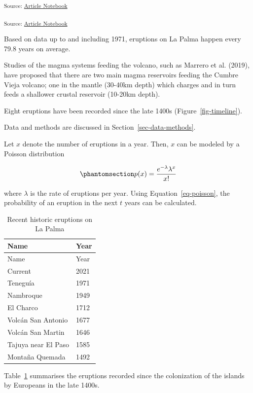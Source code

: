 \documentclass[
]{agujournal2019}
\begin{document}
\textsubscript{Source:
\href{https://tipauwel.github.io/manuscript-tutorial/index.qmd.html}{Article
Notebook}}

\textsubscript{Source:
\href{https://tipauwel.github.io/manuscript-tutorial/index.qmd.html}{Article
Notebook}}

Based on data up to and including 1971, eruptions on La Palma happen
every 79.8 years on average.

Studies of the magma systems feeding the volcano, such as Marrero et al.
(2019), have proposed that there are two main magma reservoirs feeding
the Cumbre Vieja volcano; one in the mantle (30-40km depth) which
charges and in turn feeds a shallower crustal reservoir (10-20km depth).

Eight eruptions have been recorded since the late 1400s
(Figure~\ref{fig-timeline}).

Data and methods are discussed in Section~\ref{sec-data-methods}.

Let \(x\) denote the number of eruptions in a year. Then, \(x\) can be
modeled by a Poisson distribution

\begin{equation}\phantomsection\label{eq-poisson}{
p(x) = \frac{e^{-\lambda} \lambda^{x}}{x !}
}\end{equation}

where \(\lambda\) is the rate of eruptions per year. Using
Equation~\ref{eq-poisson}, the probability of an eruption in the next
\(t\) years can be calculated.

\begin{longtable}[]{@{}ll@{}}
\caption{Recent historic eruptions on La
Palma}\label{tbl-history}\tabularnewline
\toprule\noalign{}
Name & Year \\
\midrule\noalign{}
\endfirsthead
\toprule\noalign{}
Name & Year \\
\midrule\noalign{}
\endhead
\bottomrule\noalign{}
\endlastfoot
Current & 2021 \\
Teneguía & 1971 \\
Nambroque & 1949 \\
El Charco & 1712 \\
Volcán San Antonio & 1677 \\
Volcán San Martin & 1646 \\
Tajuya near El Paso & 1585 \\
Montaña Quemada & 1492 \\
\end{longtable}

Table~\ref{tbl-history} summarises the eruptions recorded since the
colonization of the islands by Europeans in the late 1400s.
\end{document}
